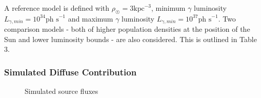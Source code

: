 \documentclass{PoS}
\begin{document}
A reference model is defined with $\rho_{\astrosun} = 3 \text{kpc}^{-3}$, minimum $\gamma$ luminosity $L_{\gamma, min} = 10^{34} \text{ph s}^{-1}$ and maximum $\gamma$ luminosity $L_{\gamma, min} = 10^{37} \text{ph s}^{-1}$. Two comparison models - both of higher population densities at the position of the Sun and lower luminosity bounds - are also considered. This is outlined in Table 3.

\begin{table}
\centering
{}
\caption{Parameters for 10 - 500 GeV Galaxy Population Simulations.}
\end{table}

\subsubsection{Simulated Diffuse Contribution}

\begin{figure}
\makeatletter
\def\@captype{table}
\makeatother
\caption{Simulated source fluxes}
\vspace{-10pt}
\end{figure}
\end{document}
